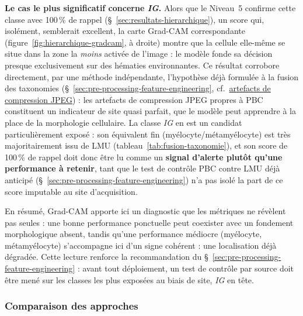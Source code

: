 \textbf{Le cas le plus significatif concerne \emph{IG}.}
Alors que le Niveau~5 confirme cette classe avec 100\,\% de rappel (\S~\ref{sec:resultats-hierarchique}), un score qui, isolément, semblerait excellent, la carte Grad-CAM correspondante (figure~\ref{fig:hierarchique-gradcam}, à droite) montre que la cellule elle-même se situe dans la zone la \emph{moins} activée de l'image : le modèle fonde sa décision presque exclusivement sur des hématies environnantes.
Ce résultat corrobore directement, par une méthode indépendante, l'hypothèse déjà formulée à la fusion des taxonomies (\S~\ref{sec:pre-processing-feature-engineering}, cf.\ \hyperref[par:jpeg-artefacts]{artefacts de compression JPEG}) : les artefacts de compression JPEG propres à PBC constituent un indicateur de site quasi parfait, que le modèle peut apprendre à la place de la morphologie cellulaire.
La classe \emph{IG} en est un candidat particulièrement exposé : son équivalent fin (myélocyte/métamyélocyte) est très majoritairement issu de LMU (tableau~\ref{tab:fusion-taxonomie}), et son score de 100\,\% de rappel doit donc être lu comme un \textbf{signal d'alerte plutôt qu'une performance à retenir}, tant que le test de contrôle \og PBC contre LMU \fg{} déjà anticipé (\S~\ref{sec:pre-processing-feature-engineering}) n'a pas isolé la part de ce score imputable au site d'acquisition.

En résumé, Grad-CAM apporte ici un diagnostic que les métriques ne révèlent pas seules : une bonne performance ponctuelle peut coexister avec un fondement morphologique absent, tandis qu'une performance médiocre (myélocyte, métamyélocyte) s'accompagne ici d'un signe cohérent : une localisation déjà dégradée.
Cette lecture renforce la recommandation du \S~\ref{sec:pre-processing-feature-engineering} : avant tout déploiement, un test de contrôle par source doit être mené sur les classes les plus exposées au biais de site, \emph{IG} en tête.

\subsubsection{Comparaison des approches}

